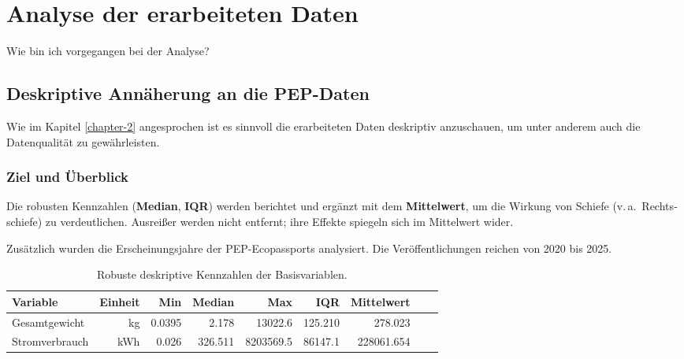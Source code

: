 \chapter{Analyse der erarbeiteten Daten}

Wie bin ich vorgegangen bei der Analyse?

\section{Deskriptive Annäherung an die PEP-Daten}
Wie im Kapitel \ref{chapter-2} angesprochen ist es sinnvoll die erarbeiteten Daten deskriptiv anzuschauen, 
um unter anderem auch die Datenqualität zu gewährleisten. 

\subsection{Ziel und Überblick}
Die robusten Kennzahlen (\textbf{Median}, \textbf{IQR}) werden berichtet und ergänzt mit dem \textbf{Mittelwert},
um die Wirkung von Schiefe (v.\,a.\ Rechts­schiefe) zu verdeutlichen. 
Ausreißer werden nicht entfernt; ihre Effekte spiegeln sich im Mittelwert wider.

Zusätzlich wurden die Erscheinungsjahre der PEP-Ecopassports analysiert. 
Die Veröffentlichungen reichen von 2020 bis 2025.  



\begin{table}[h!]
\centering
\small
\begin{tabular}{l r r r r r r r l}
\hline
\textbf{Variable} & \textbf{Einheit} & \textbf{Min} & \textbf{Median} & \textbf{Max} & \textbf{IQR} & \textbf{Mittelwert}  \\
\hline
Gesamtgewicht & kg  & 0.0395 & 2.178 & 13022.6 & 125.210 & 278.023 \\
Stromverbrauch & kWh & 0.026 & 326.511 & 8203569.5 & 86147.1 & 228061.654 \\
\hline
\end{tabular}
\caption{Robuste deskriptive Kennzahlen der Basisvariablen.}
\label{tab:basis}
\end{table}

